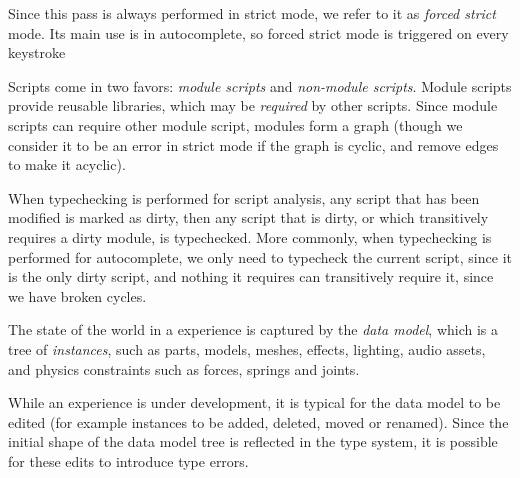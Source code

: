 \documentclass[
  acmsmall,
  review,
  anonymous,
]{acmart}
\begin{document}
Since this pass is always performed in strict mode, we refer to it as
\emph{forced strict} mode. Its main use is in autocomplete, so forced
strict mode is triggered on every keystroke

Scripts come in two favors: \emph{module scripts} and \emph{non-module
scripts}.  Module scripts provide reusable libraries, which may be
\emph{required} by other scripts. Since module scripts can require
other module script, modules form a graph (though we consider it to be
an error in strict mode if the graph is cyclic, and remove edges to
make it acyclic).

When typechecking is performed for script analysis, any script that
has been modified is marked as dirty, then any script that is dirty,
or which transitively requires a dirty module, is typechecked. More
commonly, when typechecking is performed for autocomplete, we only
need to typecheck the current script, since it is the only dirty
script, and nothing it requires can transitively require it, since we
have broken cycles.

The state of the world in a  experience is captured by
the \emph{data model}, which is a tree of \emph{instances}, such as
parts, models, meshes, effects, lighting, audio assets, and physics
constraints such as forces, springs and joints.

While an experience is under development, it is typical for the data
model to be edited (for example instances to be added, deleted, moved
or renamed). Since the initial shape of the data model tree is reflected in
the type system, it is possible for these edits to introduce type errors.
\end{document}
